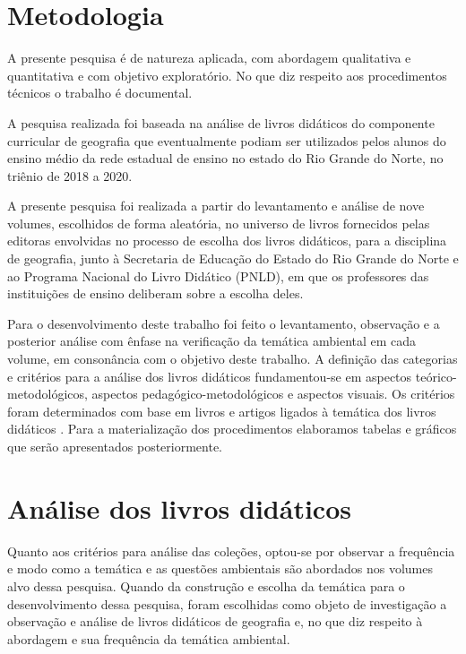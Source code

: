 \begin{refsection}
    \section{Metodologia}

    A presente pesquisa é de natureza aplicada, com abordagem qualitativa e quantitativa e com objetivo exploratório. No que diz respeito aos procedimentos técnicos o trabalho é documental.  

    A pesquisa realizada foi baseada na análise de livros didáticos do componente curricular de geografia que eventualmente podiam ser utilizados pelos alunos do ensino médio da rede estadual de ensino no estado do Rio Grande do Norte, no triênio de 2018 a 2020.  

    A presente pesquisa foi realizada a partir do levantamento e análise de nove volumes, escolhidos de forma aleatória, no universo de livros fornecidos pelas editoras envolvidas no processo de escolha dos livros didáticos, para a disciplina de geografia, junto à Secretaria de Educação do Estado do Rio Grande do Norte e ao Programa Nacional do Livro Didático (PNLD), em que os professores das instituições de ensino deliberam sobre a escolha deles.  

    Para o desenvolvimento deste trabalho foi feito o levantamento, observação e a posterior análise com ênfase na verificação da temática ambiental em cada volume, em consonância com o objetivo deste trabalho. A definição das categorias e critérios para a análise dos livros didáticos fundamentou-se em aspectos teórico-metodológicos, aspectos pedagógico-metodológicos e aspectos visuais. Os critérios foram determinados com base em livros e artigos ligados à temática dos livros didáticos \cite{BANDEIRAAndSTANGEAndSANTOS2012Proposta}. Para a materialização dos procedimentos elaboramos tabelas e gráficos que serão apresentados posteriormente.


    \section{Análise dos livros didáticos}

    Quanto aos critérios para análise das coleções, optou-se por observar a frequência e modo como a temática e as questões ambientais são abordados nos volumes alvo dessa pesquisa. Quando da construção e escolha da temática para o desenvolvimento dessa pesquisa, foram escolhidas como objeto de investigação a observação e análise de livros didáticos de geografia e, no que diz respeito à abordagem e sua frequência da temática ambiental.  


\end{refsection}
